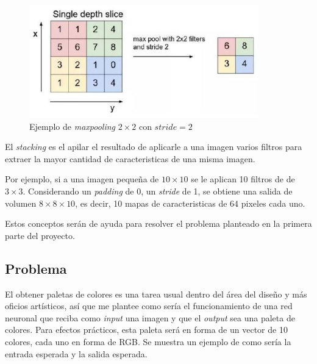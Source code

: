\documentclass[14pt,a4paper]{report}
\begin{document}
\begin{figure}[h]
  \centering
\includegraphics[scale=1]{../maxpooling.png} 
  \caption{Ejemplo de \textit{maxpooling} $2\times2$ con $\textit{stride}=2$}
  \label{fig:neural-network}
\end{figure}

El \textit{stacking} es el apilar el resultado de aplicarle a una imagen varios filtros para extraer la mayor cantidad de caracteristicas de una misma imagen. 

Por ejemplo, si a una imagen pequeña de $10 \times 10$ se le aplican 10 filtros de de $3 \times 3$. Considerando un \textit{padding} de 0, un \textit{stride} de 1, se obtiene una salida de volumen $8 \times 8 \times 10$, es decir, 10 mapas de caracteristicas de 64 pixeles cada uno.

Estos conceptos serán de ayuda para resolver el problema planteado en la primera parte del proyecto.

\subsection*{Problema}

El obtener paletas de colores es una tarea usual dentro del área del diseño y más oficios artísticos, así que me plantee como sería el funcionamiento de una red neuronal que reciba como \textit{input} una imagen y que el \textit{output} sea una paleta de colores. Para efectos prácticos, esta paleta será en forma de un vector de 10 colores, cada uno en forma de RGB. Se muestra un ejemplo de como sería la entrada esperada y la salida esperada.
\end{document}
